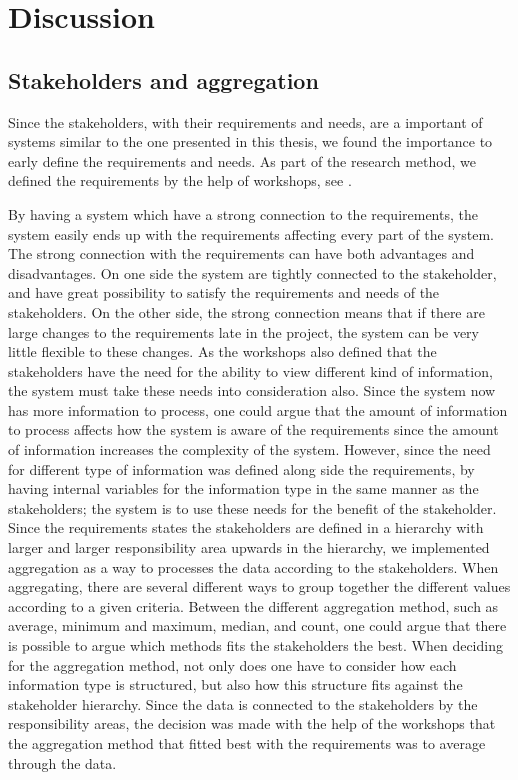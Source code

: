\chapter{Discussion}
\label{chapter:discussion}

\section{Stakeholders and aggregation} %
\label{sec:discussion_stakeholders_and_aggregation}
Since the stakeholders, with their requirements and needs, are a important of
systems similar to the one presented in this thesis, we found the importance to
early define the requirements and needs. As part of the research method, we
defined the requirements by the help of workshops, see . 

By having a system which have a strong connection to the requirements, the 
system easily ends up with the requirements affecting every part of the 
system. The strong connection with the requirements can have both advantages 
and disadvantages. On one side the system are tightly connected to the
stakeholder, and have great possibility to satisfy the requirements and needs
of the stakeholders. On the other side, the strong connection means that if 
there are large changes to the requirements late in the project, the system 
can be very little flexible to these changes. As the workshops also defined 
that the stakeholders have the need for the ability to view different kind of 
information, the system must take these needs into consideration also. Since 
the system now has more information to process, one could argue that the 
amount of information to process affects how the system is aware of the 
requirements since the amount of information increases the complexity of the 
system. However, since the need for different type of information was defined 
along side the requirements, by having internal variables for the information 
type in the same manner as the stakeholders; the system is to use these needs 
for the benefit of the stakeholder. \\

Since the requirements states the stakeholders are defined in a hierarchy with
larger and larger responsibility area upwards in the hierarchy, we implemented
aggregation as a way to processes the data according to the stakeholders. When
aggregating, there are several different ways to group together the different
values according to a given criteria. Between the different aggregation method,
such as average, minimum and maximum, median, and count, one could argue that 
there is possible to argue which methods fits the stakeholders the best. When 
deciding for the aggregation method, not only does one have to consider how 
each information type is structured, but also how this structure fits against 
the stakeholder hierarchy. Since the data is connected to the stakeholders by 
the responsibility areas, the decision was made with the help of the workshops 
that the aggregation method that fitted best with the requirements was to 
average through the data.


